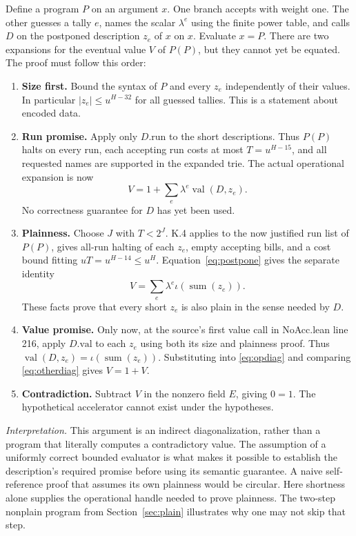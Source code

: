 \documentclass[11pt,letterpaper]{article}
\theoremstyle{definition}\newtheorem{definition}[theorem]{Definition}\newtheorem{example}[theorem]{Example}
\theoremstyle{remark}\newtheorem{remark}[theorem]{Remark}
\newcommand{\interpret}[1]{\par\smallskip\noindent\textit{Interpretation.} #1\par\smallskip}
\begin{document}
Define a program $P$ on an argument $x$. One branch accepts with weight one. The other guesses a tally $e$, names the scalar $\lambda^e$ using the finite power table, and calls $D$ on the postponed description $z_e$ of $x$ on $x$. Evaluate $x=P$. There are two expansions for the eventual value $V$ of $P(P)$, but they cannot yet be equated. The proof must follow this order:
\begin{enumerate}[leftmargin=1.7em]
\item \textbf{Size first.} Bound the syntax of $P$ and every $z_e$ independently of their values. In particular $|z_e|\le u^{H-32}$ for all guessed tallies. This is a statement about encoded data.
\item \textbf{Run promise.} Apply only $D.\mathrm{run}$ to the short descriptions. Thus $P(P)$ halts on every run, each accepting run costs at most $T=u^{H-15}$, and all requested names are supported in the expanded trie. The actual operational expansion is now
\begin{equation}\label{eq:opdiag}
 V=1+\sum_e\lambda^e\operatorname{val}(D,z_e).
\end{equation}
No correctness guarantee for $D$ has yet been used.
\item \textbf{Plainness.} Choose $J$ with $T<2^J$. K.4 applies to the now justified run list of $P(P)$, gives all-run halting of each $z_e$, empty accepting bills, and a cost bound fitting $uT=u^{H-14}\le u^H$. Equation~\eqref{eq:postpone} gives the separate identity
\begin{equation}\label{eq:otherdiag}
 V=\sum_e\lambda^e\iota(\operatorname{sum}(z_e)).
\end{equation}
These facts prove that every short $z_e$ is also plain in the sense needed by $D$.
\item \textbf{Value promise.} Only now, at the source's first value call in NoAcc.lean line 216, apply $D.\mathrm{val}$ to each $z_e$ using both its size and plainness proof. Thus $\operatorname{val}(D,z_e)=\iota(\operatorname{sum}(z_e))$. Substituting into \eqref{eq:opdiag} and comparing \eqref{eq:otherdiag} gives $V=1+V$.
\item \textbf{Contradiction.} Subtract $V$ in the nonzero field $E$, giving $0=1$. The hypothetical accelerator cannot exist under the hypotheses.
\end{enumerate}
\interpret{This argument is an indirect diagonalization, rather than a program that literally computes a contradictory value. The assumption of a uniformly correct bounded evaluator is what makes it possible to establish the description's required promise before using its semantic guarantee. A naive self-reference proof that assumes its own plainness would be circular. Here shortness alone supplies the operational handle needed to prove plainness. The two-step nonplain program from Section~\ref{sec:plain} illustrates why one may not skip that step.}
\end{document}
